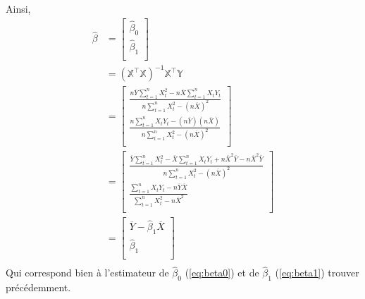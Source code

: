 \documentclass[11pt,french]{report}
\begin{document}
Ainsi,
\begin{align*}
\hat{\beta} &= 
\begin{bmatrix} 
\hat{\beta}_0 \\
\hat{\beta}_1 \\
\end{bmatrix} \\
&= (\mathbb{X}^\intercal\mathbb{X})^{-1}\mathbb{X}^\intercal\mathbb{Y} \\
&= 
\begin{bmatrix} 
\frac{n \overline{Y} \displaystyle\sum_{t=1}^n X_t^2 - n \overline{X} \displaystyle\sum_{t=1}^n X_tY_t}{n \displaystyle\sum_{t=1}^n X_t^2 - (n \overline{X})^2} \\
\frac{n\displaystyle\sum_{t=1}^n X_tY_t - (n \overline{Y})(n \overline{X}) }{n \displaystyle\sum_{t=1}^n X_t^2 - (n \overline{X})^2} \\
\end{bmatrix} \\
&=
\begin{bmatrix} 
\frac{\overline{Y} \displaystyle\sum_{t=1}^n X_t^2 - \overline{X} \displaystyle\sum_{t=1}^n X_tY_t + n\overline{X}^2\overline{Y} - n\overline{X}^2\overline{Y}}{n \displaystyle\sum_{t=1}^n X_t^2 - (n \overline{X})^2} \\
\frac{\displaystyle\sum_{t=1}^n X_tY_t - n\overline{Y}\overline{X}}{\displaystyle\sum_{t=1}^n X_t^2 - n \overline{X}^2} \\
\end{bmatrix} \\
&=
\begin{bmatrix} 
\overline{Y} - \hat{\beta}_1\overline{X} \\
\hat{\beta}_1 \\
\end{bmatrix} \\
\end{align*}
Qui correspond bien à l'estimateur de $\hat{\beta}_0$ (\ref{eq:beta0}) et de $\hat{\beta}_1$ (\ref{eq:beta1}) trouver précédemment.
\end{document}
